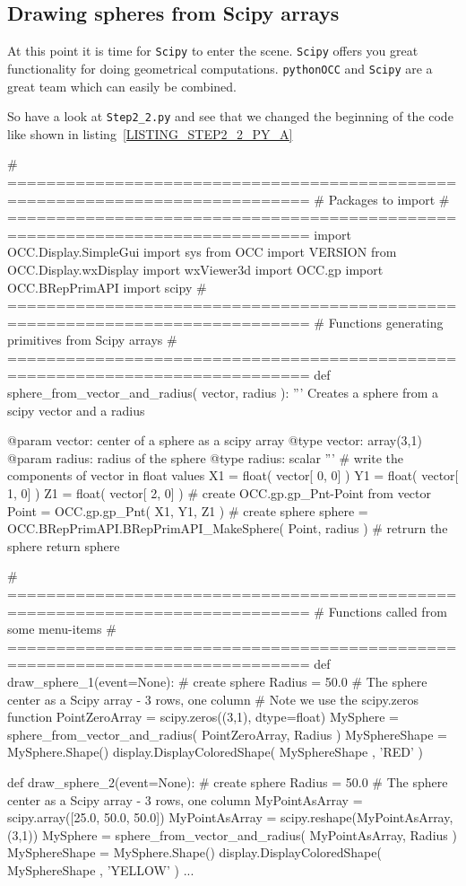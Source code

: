 \subsection{Drawing spheres from Scipy arrays}
At this point it is time for {\tt Scipy} to enter the scene.
{\tt Scipy} offers you great functionality for doing geometrical computations.
{\tt pythonOCC} and {\tt Scipy} are a great team which can easily be combined.

So have a look at {\tt Step2\_2.py} and see that we changed the beginning of the code like shown in listing~\ref{LISTING_STEP2_2_PY_A}
\begin{python}[moreemph={[4], 46, 48},caption={Step2\_1.py - Involve Scipy},label=LISTING_STEP2_2_PY_A]
# =============================================================================
# Packages to import
# =============================================================================
import OCC.Display.SimpleGui 
import sys
from OCC import VERSION
from OCC.Display.wxDisplay import wxViewer3d
import OCC.gp 
import OCC.BRepPrimAPI 
import scipy
# =============================================================================
# Functions generating primitives from Scipy arrays
# =============================================================================
def sphere_from_vector_and_radius(  vector, 
                                    radius ):
    '''
    Creates a sphere from a scipy vector and a radius

    @param vector: center of a sphere as a scipy array
    @type  vector: array(3,1)
    @param radius: radius of the sphere
    @type  radius: scalar
    '''
    # write the components of vector in float values
    X1 = float( vector[ 0, 0] )
    Y1 = float( vector[ 1, 0] )
    Z1 = float( vector[ 2, 0] )
    # create OCC.gp.gp_Pnt-Point from vector
    Point = OCC.gp.gp_Pnt( X1, Y1, Z1 )
    # create sphere
    sphere = OCC.BRepPrimAPI.BRepPrimAPI_MakeSphere( Point, radius )
    # retrurn the sphere
    return sphere 

# =============================================================================
# Functions called from some menu-items
# =============================================================================
def draw_sphere_1(event=None):
    # create sphere
    Radius = 50.0
    # The sphere center as a Scipy array - 3 rows, one column
    # Note we use the scipy.zeros function
    PointZeroArray = scipy.zeros((3,1), dtype=float)
    MySphere = sphere_from_vector_and_radius(   PointZeroArray, 
                                                Radius )
    MySphereShape = MySphere.Shape()
    display.DisplayColoredShape( MySphereShape , 'RED' ) 

def draw_sphere_2(event=None):
    # create sphere
    Radius = 50.0
    # The sphere center as a Scipy array - 3 rows, one column
    MyPointAsArray = scipy.array([25.0, 50.0, 50.0])
    MyPointAsArray = scipy.reshape(MyPointAsArray,(3,1))
    MySphere = sphere_from_vector_and_radius(   MyPointAsArray, 
                                                Radius )
    MySphereShape = MySphere.Shape()
    display.DisplayColoredShape( MySphereShape , 'YELLOW' ) 
...    
\end{python}
